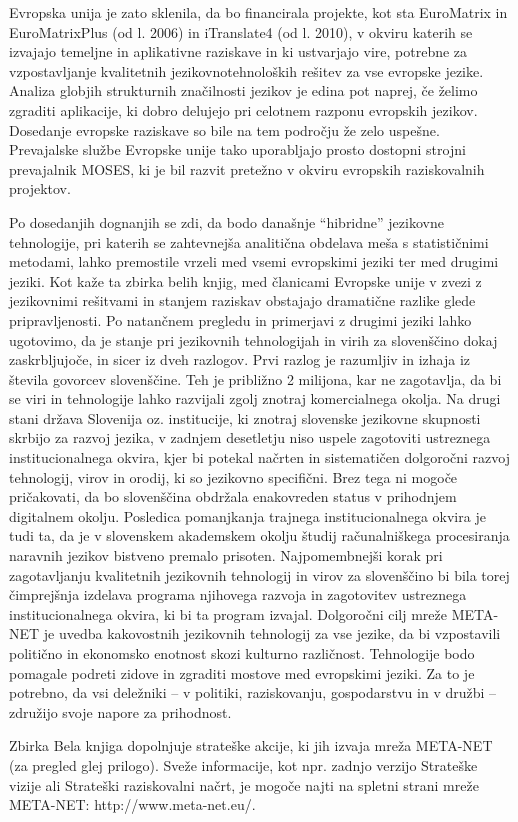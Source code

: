 \begin{multicols}{2}

Evropska unija je zato sklenila, da bo financirala projekte, kot sta EuroMatrix in EuroMatrixPlus (od l. 2006) in iTranslate4 (od l. 2010), v okviru katerih se izvajajo temeljne in aplikativne raziskave in ki ustvarjajo vire, potrebne za vzpostav\-ljanje kvalitetnih jezikovnotehnoloških rešitev za vse evropske jezike. Analiza globjih strukturnih značilnosti jezikov je edina pot naprej, če želimo zgraditi aplikacije, ki dobro delujejo pri celotnem razponu evropskih jezikov. Dosedanje evropske raziskave so bile na tem področju že zelo uspešne. Prevajalske službe Evropske unije tako uporab\-ljajo prosto dostopni stroj\-ni prevajalnik MOSES, ki je bil razvit pretežno v okviru evropskih raziskovalnih projektov.

Po dosedanjih dognanjih se zdi, da bodo današnje “hibridne” jezikovne tehnologije, pri katerih se zah\-tevnej\-ša analitična obdelava meša s statistič\-nimi metodami, lahko premostile vrzeli med vsemi evropskimi jeziki ter med drugimi jeziki. Kot kaže ta zbirka belih knjig, med članicami Evropske unije v zvezi z jezikovnimi rešitvami in stanjem raziskav obstajajo dramatične razlike glede priprav\-ljenosti. Po natančnem pregledu in primerjavi z drugimi jeziki lahko ugotovimo, da je stanje pri jezikovnih tehnologijah in virih za slovenščino dokaj zaskrb\-ljujoče, in sicer iz dveh razlogov. Prvi razlog je razumljiv in izhaja iz števila go\-vorcev slovenščine. Teh je približno 2 mili\-jona, kar ne zagotav\-lja, da bi se viri in tehnologije lahko razvijali zgolj znotraj komercialnega okolja. Na drugi stani država Slovenija oz. institucije, ki znotraj slovenske jezikovne skupnosti skrbijo za razvoj jezika, v zadnjem desetletju niso uspele zagotoviti ustreznega institucionalnega okvira, kjer bi potekal načrten in sistema\-tičen dolgoročni razvoj tehnologij, virov in orodij, ki so jezikovno specifični. Brez tega ni mogoče pričakovati, da bo slovenščina obdržala enakovreden status v prihodnjem digitalnem okolju. Posledica pomanjkanja trajnega institucionalnega okvira je tudi ta, da je v slovenskem akademskem okolju študij računalniškega procesiranja naravnih jezikov bistveno premalo prisoten. Naj\-pomembnejši korak pri zagotav\-ljanju kvalitetnih jezikovnih tehnologij in virov za slovenščino bi bila torej čimprejšnja izdelava programa njihovega razvoja in zagotovitev ustreznega institucionalnega okvira, ki bi ta program izvajal. Dolgoročni cilj mreže META-NET je uvedba kakovostnih jezikovnih tehnologij za vse jezike, da bi vzpostavili politično in ekonomsko enotnost skozi kulturno različnost. Tehnologije bodo pomagale podreti zidove in zgraditi mostove med evropskimi jeziki. Za to je potrebno, da vsi deležniki – v politiki, raziskovanju, gospodarstvu in v družbi – združijo svoje napore za prihodnost.

Zbirka Bela knjiga dopolnjuje strateške akcije, ki jih izvaja mreža META-NET (za pregled glej pri\-logo). Sveže informacije, kot npr. zadnjo verzijo Strateške vizije \cite{Meta1} ali Strateški raziskovalni načrt, je mogoče naj\-ti na spletni strani mreže META-NET: http://www.meta-net.eu/. 
\end{multicols}

